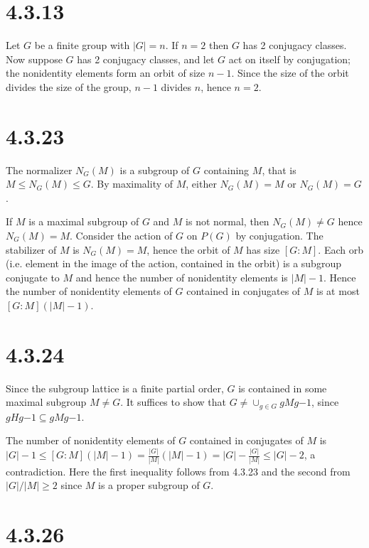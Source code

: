 \documentclass{article}
\def\inv{{-1}}
\begin{document}
\section*{4.3.13}

Let $G$ be a finite group with $|G| = n$. If $n = 2$ then $G$ has 2 conjugacy classes. Now suppose $G$ has 2 conjugacy classes, and let $G$ act on itself by conjugation; the nonidentity elements form an orbit of size $n-1$. Since the size of the orbit divides the size of the group, $n-1$ divides $n$, hence $n = 2$.

\section*{4.3.23}

The normalizer $N_G(M)$ is a subgroup of $G$ containing $M$, that is $M \le N_G(M) \le G$. By maximality of $M$, either $N_G(M) = M$ or $N_G(M) = G$. 

If $M$ is a maximal subgroup of $G$ and $M$ is not normal, then $N_G(M) \ne G$ hence $N_G(M) = M$. Consider the action of $G$ on $P(G)$ by conjugation. The stabilizer of $M$ is $N_G(M) = M$, hence the orbit of $M$ has size $[G:M]$. Each orb (i.e. element in the image of the action, contained in the orbit) is a subgroup conjugate to $M$ and hence the number of nonidentity elements is $|M|-1$. Hence the number of nonidentity elements of $G$ contained in conjugates of $M$ is at most $[G:M] (|M|-1)$.
\section*{4.3.24}

Since the subgroup lattice is a finite partial order, $G$ is contained in some maximal subgroup $M \ne G$. It suffices to show that $G \ne \cup_{g \in G} gMg\inv$, since $gHg\inv \subseteq gMg\inv$.

The number of nonidentity elements of $G$ contained in conjugates of $M$ is $|G| - 1 \le [G:M] (|M|-1) = \frac{|G|}{|M|}(|M|-1) = |G| - \frac{|G|}{|M|} \le |G| - 2$, a contradiction. Here the first inequality follows from 4.3.23 and the second from $|G| / |M| \ge 2$ since $M$ is a proper subgroup of $G$.

\section*{4.3.26}
\end{document}
